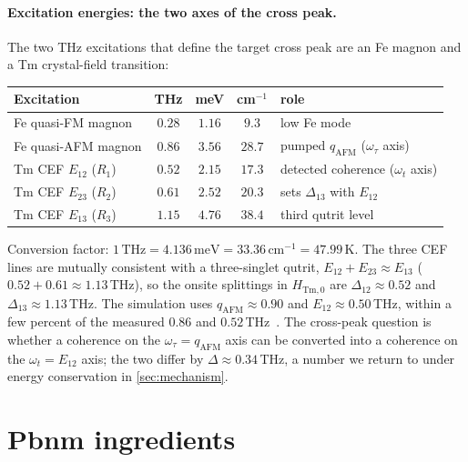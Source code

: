 \documentclass[11pt,a4paper]{article}
\newcommand{\Tm}{\mathrm{Tm}}
\begin{document}
\paragraph{Excitation energies: the two axes of the cross peak.}
The two THz excitations that define the target cross peak are an Fe magnon and
a Tm crystal-field transition:
\begin{center}
\renewcommand{\arraystretch}{1.25}
\begin{tabular}{lcccl}
\toprule
Excitation & THz & meV & cm$^{-1}$ & role \\
\midrule
Fe quasi-FM magnon        & $0.28$        & $1.16$        & $9.3$        & low Fe mode \\
Fe quasi-AFM magnon       & $0.86$        & $3.56$        & $28.7$       & pumped $q_{\mathrm{AFM}}$ ($\omega_\tau$ axis) \\
Tm CEF $E_{12}$ ($R_1$)   & $0.52$        & $2.15$        & $17.3$       & detected coherence ($\omega_t$ axis) \\
Tm CEF $E_{23}$ ($R_2$)   & $0.61$        & $2.52$        & $20.3$       & sets $\Delta_{13}$ with $E_{12}$ \\
Tm CEF $E_{13}$ ($R_3$)   & $1.15$        & $4.76$        & $38.4$       & third qutrit level \\
\bottomrule
\end{tabular}
\end{center}
Conversion factor: $1\,\mathrm{THz}=4.136\,\mathrm{meV}=33.36\,\mathrm{cm^{-1}}
=47.99\,\mathrm K$.  The three CEF lines are mutually consistent with a
three-singlet qutrit, $E_{12}+E_{23}\approx E_{13}$
($0.52+0.61\approx1.13\,$THz), so the onsite splittings in $H_{\Tm,0}$ are
$\Delta_{12}\approx0.52$ and $\Delta_{13}\approx1.13\,$THz.  The simulation
uses $q_{\mathrm{AFM}}\approx0.90$ and $E_{12}\approx0.50\,$THz, within a few
percent of the measured $0.86$ and $0.52\,$THz~\cite{Zhang2016,MP2018}.  The
cross-peak question is whether a coherence on the
$\omega_\tau=q_{\mathrm{AFM}}$ axis can be converted into a coherence on the
$\omega_t=E_{12}$ axis; the two differ by $\Delta\approx0.34\,$THz, a number we
return to under energy conservation in \cref{sec:mechanism}.

\section{Pbnm ingredients}
\end{document}
